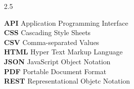 \renewcommand{\baselinestretch}{2.5}
\baselinestretch

\noindent \textbf{API} \hspace{2cm}  Application Programming Interface \\
\textbf{CSS}  \hspace{2cm} Cascading Style Sheets \\
\textbf{CSV}  \hspace{2cm}  Comma-separated Values \\
\textbf{HTML} \hspace{2cm}  Hyper Text Markup Language \\
\textbf{JSON} \hspace{2cm}  JavaScript Object Notation \\
\textbf{PDF}  \hspace{2cm}  Portable Document Format \\
\textbf{REST} \hspace{2cm}  Representational Objetc Notation \\

